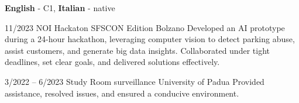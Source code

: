 \documentclass[9pt]{developercv} %
\begin{document}

\vspace{-10 pt}
    \vspace{-6pt}
    
    \hspace{26mm} \textbf{English} - C1, 
    \textbf{ Italian} - native

\vspace{-10 pt}
\begin{entrylist}

	\entry
	{11/2023}
	{NOI Hackaton SFSCON Edition}
	{Bolzano}
	{Developed an AI prototype during a 24-hour hackathon, leveraging computer vision to detect parking abuse, assist customers, and generate big data insights. Collaborated under tight deadlines, set clear goals, and delivered solutions effectively.}
 
 	\entry
        {3/2022 -- 6/2023}
		{Study Room surveillance}
		{University of Padua}
            {Provided assistance, resolved issues, and ensured a conducive environment.}

\end{entrylist}
\end{document}
